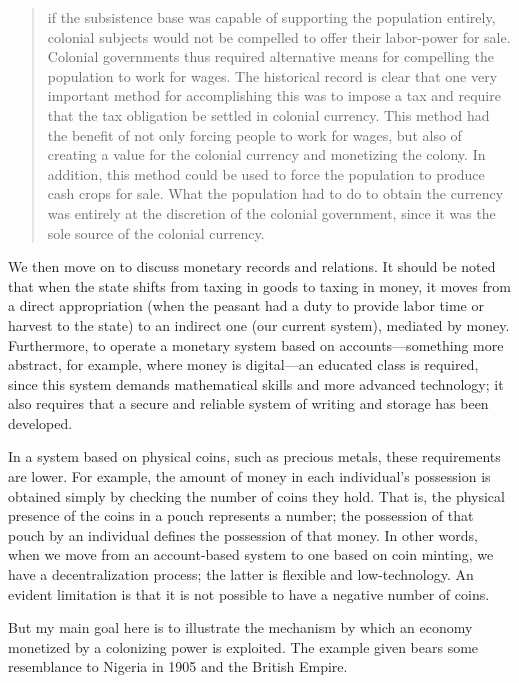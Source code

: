\begin{quote}
if the subsistence base was capable of supporting the population entirely, colonial subjects would not be compelled to offer their labor-power for sale. Colonial governments thus required alternative means for compelling the population to work for wages. The historical record is clear that one very important method for accomplishing this was to impose a tax and require that the tax obligation be settled in colonial currency. This method had the benefit of not only forcing people to work for wages, but also of creating a value for the colonial currency and monetizing the colony. In addition, this method could be used to force the population to produce cash crops for sale. What the population had to do to obtain the currency was entirely at the discretion of the colonial government, since it was the sole source of the colonial currency.

\end{quote}

We then move on to discuss monetary records and relations. It should be noted that when the state shifts from taxing in goods to taxing in money, it moves from a direct appropriation (when the peasant had a duty to provide labor time or harvest to the state) to an indirect one (our current system), mediated by money. Furthermore, to operate a monetary system based on accounts—something more abstract, for example, where money is digital—an educated class is required, since this system demands mathematical skills and more advanced technology; it also requires that a secure and reliable system of writing and storage has been developed.

In a system based on physical coins, such as precious metals, these requirements are lower. For example, the amount of money in each individual’s possession is obtained simply by checking the number of coins they hold. That is, the physical presence of the coins in a pouch represents a number; the possession of that pouch by an individual defines the possession of that money. In other words, when we move from an account-based system to one based on coin minting, we have a decentralization process; the latter is flexible and low-technology. An evident limitation is that it is not possible to have a negative number of coins.

But my main goal here is to illustrate the mechanism by which an economy monetized by a colonizing power is exploited. The example given bears some resemblance to Nigeria in 1905 and the British Empire.


